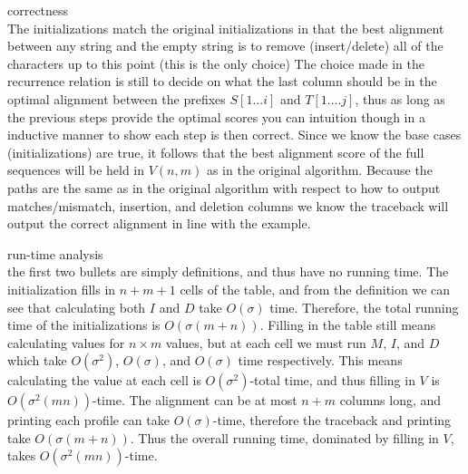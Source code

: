 \documentclass[11pt, oneside]{article}   	%
\begin{document}
{\Large correctness}\\
The initializations match the original initializations in that the best alignment between any string and the empty string is to remove (insert/delete) 
all of the characters up to this point (this is the only choice)
The choice made in the recurrence relation is still to decide on what the last column should be in the optimal alignment between the prefixes $S[1...i]$ and $T[1....j]$, 
thus as long as the previous steps provide the optimal scores you can intuition though in a inductive manner to show each step is then correct. 
Since we know the base cases (initializations) are true, it follows that the best alignment score of the full sequences will be held in $V(n,m)$ as in the original algorithm. 
Because the paths are the same as in the original algorithm with respect to how to output matches/mismatch, insertion, and deletion columns
we know the traceback will output the correct alignment in line with the example. 

{\Large run-time analysis}\\
the first two bullets are simply definitions, and thus have no running time. 
The initialization fills in $n+m+1$ cells of the table, and from the definition we can see that calculating both $I$ and $D$ take $O(\sigma)$ time. 
Therefore, the total running time of the initializations is $O\left(\sigma\left(m+n\right)\right)$.
Filling in the table still means calculating values for $n\times m$ values, but at each cell we must run $M$, $I$, and $D$ which take $O(\sigma^2)$, $O(\sigma)$, and $O(\sigma)$ time respectively. 
This means calculating the value at each cell is $O(\sigma^2)$-total time, 
and thus filling in $V$ is $O\left(\sigma^2\left(mn\right)\right)$-time. 
The alignment can be at most $n+m$ columns long, and printing each profile can take $O(\sigma)$-time, therefore the traceback and printing take $O\left(\sigma\left(m+n\right)\right)$.
Thus the overall running time, dominated by filling in $V$, takes $O\left(\sigma^2\left(mn\right)\right)$-time.
\end{document}
